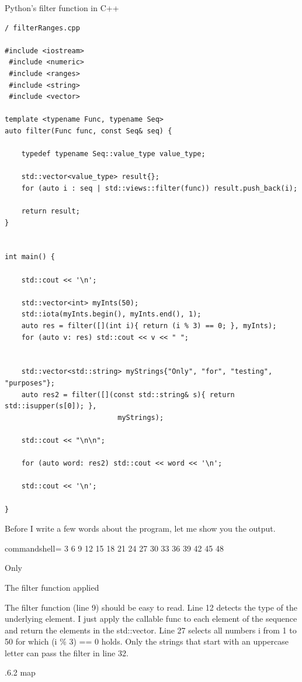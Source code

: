 \noindent
Python’s filter function in C++
\begin{lstlisting}[style=styleCXX]
/ filterRanges.cpp

#include <iostream>
 #include <numeric>
 #include <ranges>
 #include <string>
 #include <vector>

template <typename Func, typename Seq>
auto filter(Func func, const Seq& seq) {

	typedef typename Seq::value_type value_type;
	
	std::vector<value_type> result{};
	for (auto i : seq | std::views::filter(func)) result.push_back(i);
	
	return result;
}


int main() {
	
	std::cout << '\n';
	
	std::vector<int> myInts(50);
	std::iota(myInts.begin(), myInts.end(), 1);
	auto res = filter([](int i){ return (i % 3) == 0; }, myInts);
	for (auto v: res) std::cout << v << " ";
	
	
	std::vector<std::string> myStrings{"Only", "for", "testing", "purposes"};
	auto res2 = filter([](const std::string& s){ return std::isupper(s[0]); },
	                       myStrings);
	
	std::cout << "\n\n";
	
	for (auto word: res2) std::cout << word << '\n';
	
	std::cout << '\n';

}
\end{lstlisting}

Before I write a few words about the program, let me show you the output.

\begin{tcblisting}{commandshell={}}
3 6 9 12 15 18 21 24 27 30 33 36 39 42 45 48

Only
\end{tcblisting}

\begin{center}
The filter function applied
\end{center}

The filter function (line 9) should be easy to read. Line 12 detects the type of the underlying element. I just apply the callable func to each element of the sequence and return the elements in the std::vector. Line 27 selects all numbers i from 1 to 50 for which (i \% 3) == 0 holds. Only the strings that start with an uppercase letter can pass the filter in line 32.

.6.2\hspace{0.2cm} map

